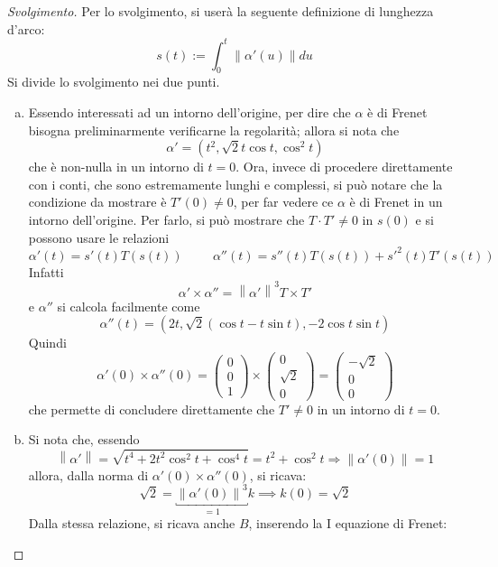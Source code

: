 \documentclass[12pt]{article}
\theoremstyle{style}
\newenvironment{svolgimento}{\renewcommand\qedsymbol{$\blacksquare$}\begin{proof}[Svolgimento]}{\end{proof}}
\numberwithin{equation}{subsection}
\begin{document}
\begin{svolgimento} Per lo svolgimento, si user\`a la seguente definizione di lunghezza d'arco:
	\[
	s(t) := \int_{0} ^t \left\lVert \alpha '(u) \right\rVert du
	\] 
	Si divide lo svolgimento nei due punti.
	\begin{enumerate}[(a).]
		\item Essendo interessati ad un intorno dell'origine, per dire che $\alpha $ \`e di Frenet bisogna preliminarmente verificarne la regolarit\`a; allora si nota che
			\[
			\alpha ' = \left(t^2 , \sqrt{2} t \cos t, \cos^2 t\right) 
			\] 
			che \`e non-nulla in un intorno di $t=0$.  
			Ora, invece di procedere direttamente con i conti, che sono estremamente lunghi e complessi, si pu\`o notare che la condizione da mostrare \`e $T'(0) \neq 0$, per far vedere ce $\alpha $ \`e di Frenet in un intorno dell'origine.
			Per farlo, si pu\`o mostrare che $T \cdot T' \neq 0$ in $s(0)$ e si possono usare le relazioni
			\[
			\alpha ' (t) = s'(t) T(s(t)) \hspace{1cm}\alpha ''(t) =s''(t)T(s(t)) + s'^2 (t) T'(s(t))
			\] 
			Infatti
			\[
			\alpha ' \times \alpha '' = \left\lVert \alpha ' \right\rVert ^3 T \times T'
			\] 
			e $\alpha ''$ si calcola facilmente come
			\[
			\alpha ''(t)  =\left(2t , \sqrt{2} (\cos t - t \sin t),-2 \cos t \sin t\right) 
			\] 
			Quindi 
			\[
			\alpha '(0) \times  \alpha ''(0) = \begin{pmatrix} 0\\ 0 \\ 1  \end{pmatrix} \times \begin{pmatrix} 0 \\\sqrt{2} \\0 \end{pmatrix} = \begin{pmatrix} -\sqrt{2} \\ 0 \\ 0 \end{pmatrix} 
			\] 
		che permette di concludere direttamente che $T' \neq 0$ in un intorno di $t=0$.
	\item 	Si nota che, essendo 
		\[
		\left\lVert \alpha ' \right\rVert = \sqrt{t^4 + 2 t^2 \cos^2 t + \cos^4 t} = t^2 + \cos^2 t \Rightarrow \left\lVert \alpha '(0) \right\rVert = 1
		\] 
		allora, dalla norma di $\alpha '(0) \times \alpha ''(0)$, si ricava:
		\[
		\sqrt{2} = \underbracket{\left\lVert \alpha '(0) \right\rVert ^3}_{=1} k\implies k(0) = \sqrt{2} 
		\] 
		Dalla stessa relazione, si ricava anche $B$, inserendo la I equazione di Frenet:

\end{enumerate}
\end{svolgimento}
\end{document}
